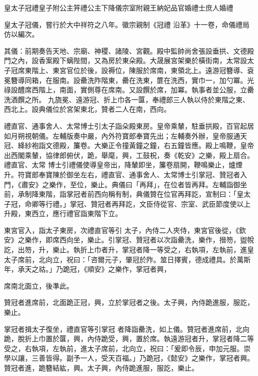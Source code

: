 
\begin{pinyinscope}

 皇太子冠禮皇子附公主笄禮公主下降儀宗室附親王納妃品官婚禮士庶人婚禮



 皇太子冠儀，嘗行於大中祥符之八年。徽宗親制《冠禮
 沿革》十一卷，命儀禮局仿以編次。



 其儀：前期奏告天地、宗廟、神稷、諸陵、宮觀。殿中監帥尚舍張設垂拱、文德殿門之內，設香案殿下螭陛間，又為房於東朵殿。大晟展宮架樂於橫街南，太常設太子冠席東階上、東宮官位於後，設褥位，陳服於席南，東領北上。遠游冠簪導、袞冕簪導同箱，在服南。設罍洗阼階東，罍在洗東，篚在洗西，實巾一，加勺冪。光祿設醴席西階上，南面，實側尊在席南。又設饌於席，加冪。執事者並公服，立罍洗酒饌之所。
 九旒冕、遠游冠、折上巾各一匴，奉禮郎三人執以侍於東階之東、西北上。設典儀位於宮架東北，贊者二人在南，西向。



 禮直官、通事舍人、太常博士引太子詣朵殿東房。皇帝乘輦，駐垂拱殿，百官起居如月朔視朝儀。左輔版奏中嚴，內外符寶郎奉寶先出；左輔奏外辦，皇帝服通天冠、絳紗袍詣文德殿，簾卷。大樂正令撞黃鐘之鐘，右五鐘皆應。殿上鳴鞭，皇帝出西閣乘輦，協律郎俯伏，跪，舉麾，興，工鼓柷，奏《乾安》之樂，殿上扇合。禮直官、太常
 博士引禮儀使導皇帝出，降輦即坐，簾卷扇開，鞭鳴樂止，爐煙升。符寶郎奉寶陳於御坐左右，禮直官、通事舍人、太常博士引掌冠、贊冠者入門，《肅安》之樂作，至位，樂止。典儀曰「再拜」，在位者皆再拜。左輔詣御坐前，承制降東階，詣掌冠者前西向稱有制，典儀贊在位官再拜訖，宣制曰：「皇太子冠，命卿等行禮。」掌冠、贊冠者再拜訖，文臣侍從官、宗室、武臣節度使以上升殿，東西立，應行禮官詣東階下立。



 東宮官入，詣太子東房，次禮直官等引
 太子，內侍二人夾侍，東宮官後從，《欽安》之樂作，即席西向坐，樂止。引掌冠、贊冠者以次詣罍洗，樂作，搢笏，盥帨訖，出笏，升，樂止。執折上巾者升，掌冠者降一等受之，右執項，左執前，進皇太子席前，北向立，祝曰：「咨爾元子，肇冠於阼。筮日擇賓，德成禮具。於萬斯年，承天之祜。」乃跪冠，《順安》之樂作，掌冠者興，



 席南北面立，後準此。



 贊冠者進席前，北面跪正冠，興，立於掌冠者之後。太子興，內侍跪進服，服訖，樂止。



 掌冠者揖太子復坐，禮直官等引掌冠
 者降詣罍洗，如上儀。贊冠者進席前，北向跪，脫折上巾置於匴，興，內侍跪受，興，置於席。執遠游冠者升，掌冠者降二等受之，右執項，左執前，進太子席前，北向立，祝曰：「爰即令辰，申加元服。崇學以讓，三善皆得。副予一人，受天百福。」乃跪冠，《懿安》之樂作，掌冠者興。贊冠者進，跪簪結紘，興。太子興，內侍跪進服，服訖，樂止。




\end{pinyinscope}
